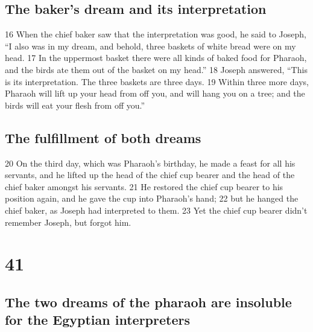 \hypertarget{the-bakers-dream-and-its-interpretation}{%
\subsection{The baker's dream and its
interpretation}\label{the-bakers-dream-and-its-interpretation}}

{16} When the chief baker saw that the interpretation was good, he said
to Joseph, ``I also was in my dream, and behold, three baskets of white
bread were on my head. {17} In the uppermost basket there were all kinds
of baked food for Pharaoh, and the birds ate them out of the basket on
my head.'' {18} Joseph answered, ``This is its interpretation. The three
baskets are three days. {19} Within three more days, Pharaoh will lift
up your head from off you, and will hang you on a tree; and the birds
will eat your flesh from off you.''

\hypertarget{the-fulfillment-of-both-dreams}{%
\subsection{The fulfillment of both
dreams}\label{the-fulfillment-of-both-dreams}}

{20} On the third day, which was Pharaoh's birthday, he made a feast for
all his servants, and he lifted up the head of the chief cup bearer and
the head of the chief baker amongst his servants. {21} He restored the
chief cup bearer to his position again, and he gave the cup into
Pharaoh's hand; {22} but he hanged the chief baker, as Joseph had
interpreted to them. {23} Yet the chief cup bearer didn't remember
Joseph, but forgot him.

\hypertarget{section-40}{%
\section{41}\label{section-40}}

\hypertarget{the-two-dreams-of-the-pharaoh-are-insoluble-for-the-egyptian-interpreters}{%
\subsection{The two dreams of the pharaoh are insoluble for the Egyptian
interpreters}\label{the-two-dreams-of-the-pharaoh-are-insoluble-for-the-egyptian-interpreters}}

